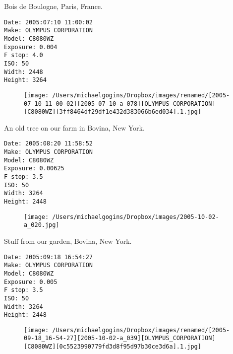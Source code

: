 \documentclass[11pt,letter,DIV=14,paper=landscape]{scrbook}
\begin{document}
\clearpage
\noindent Bois de Boulogne, Paris, France.
\noindent
\begin{lstlisting}
Date: 2005:07:10 11:00:02
Make: OLYMPUS CORPORATION
Model: C8080WZ
Exposure: 0.004
F stop: 4.0
ISO: 50
Width: 2448
Height: 3264
\end{lstlisting}
\clearpage

\begin{figure}
\texttt{[image: /Users/michaelgogins/Dropbox/images/renamed/[2005-07-10\_11-00-02][2005-07-10-a\_078][OLYMPUS\_CORPORATION][C8080WZ][3ff8464df29df1e432d383066b6ed034].1.jpg]}
\end{figure}
    
\clearpage
\noindent An old tree on our farm in Bovina, New York.
\noindent
\begin{lstlisting}
Date: 2005:08:20 11:58:52
Make: OLYMPUS CORPORATION
Model: C8080WZ
Exposure: 0.00625
F stop: 3.5
ISO: 50
Width: 3264
Height: 2448
\end{lstlisting}
\clearpage

\begin{figure}
\texttt{[image: /Users/michaelgogins/Dropbox/images/2005-10-02-a\_020.jpg]}
\end{figure}
    
\clearpage
\noindent Stuff from our garden, Bovina, New York.
\noindent
\begin{lstlisting}
Date: 2005:09:18 16:54:27
Make: OLYMPUS CORPORATION
Model: C8080WZ
Exposure: 0.005
F stop: 3.5
ISO: 50
Width: 3264
Height: 2448
\end{lstlisting}
\clearpage

\begin{figure}
\texttt{[image: /Users/michaelgogins/Dropbox/images/renamed/[2005-09-18\_16-54-27][2005-10-02-a\_039][OLYMPUS\_CORPORATION][C8080WZ][0c5523990779fd3d8f95d97b30ce3d6a].1.jpg]}
\end{figure}
    
\end{document}
